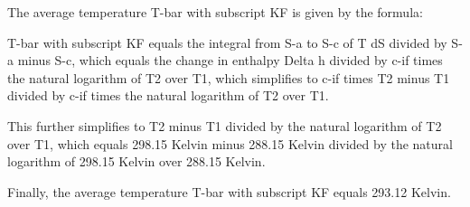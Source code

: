 The average temperature T-bar with subscript KF is given by the formula:

T-bar with subscript KF equals the integral from S-a to S-c of T dS divided by S-a minus S-c, which equals the change in enthalpy Delta h divided by c-if times the natural logarithm of T2 over T1, which simplifies to c-if times T2 minus T1 divided by c-if times the natural logarithm of T2 over T1.

This further simplifies to T2 minus T1 divided by the natural logarithm of T2 over T1, which equals 298.15 Kelvin minus 288.15 Kelvin divided by the natural logarithm of 298.15 Kelvin over 288.15 Kelvin.

Finally, the average temperature T-bar with subscript KF equals 293.12 Kelvin.